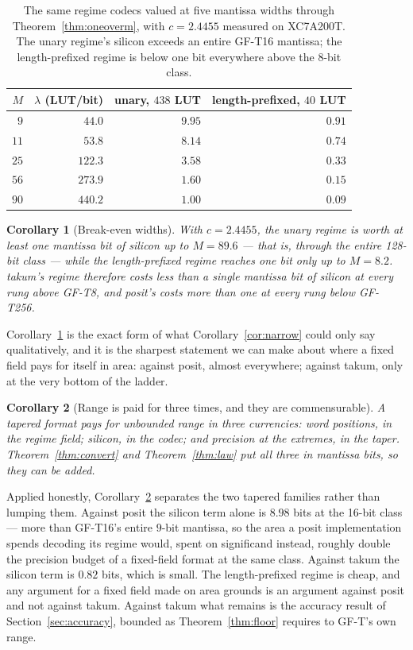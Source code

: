 \documentclass[11pt]{article}
\newtheorem{corollary}{Corollary}
\theoremstyle{definition}
\begin{document}
\begin{table}[t]\centering
\caption{The same regime codecs valued at five mantissa widths through
Theorem~\ref{thm:oneoverm}, with $c = 2.4455$ measured on XC7A200T. The unary
regime's silicon exceeds an entire GF-T16 mantissa; the length-prefixed regime is
below one bit everywhere above the 8-bit class.}
\label{tab:oneoverm}
\begin{tabular}{rrrr}
\toprule
$M$ & $\lambda$ (LUT/bit) & unary, $438$ LUT & length-prefixed, $40$ LUT \\
\midrule
$9$  & $44.0$  & $\mathbf{9.95}$ & $0.91$ \\
$11$ & $53.8$  & $8.14$ & $0.74$ \\
$25$ & $122.3$ & $3.58$ & $0.33$ \\
$56$ & $273.9$ & $1.60$ & $0.15$ \\
$90$ & $440.2$ & $1.00$ & $0.09$ \\
\bottomrule
\end{tabular}
\end{table}

\begin{corollary}[Break-even widths]
\label{cor:breakeven}
With $c = 2.4455$, the unary regime is worth at least one mantissa bit of silicon
up to $M = 89.6$ --- that is, through the entire 128-bit class --- while the
length-prefixed regime reaches one bit only up to $M = 8.2$. takum's regime
therefore costs less than a single mantissa bit of silicon at every rung above
GF-T8, and posit's costs more than one at every rung below GF-T256.
\end{corollary}

Corollary~\ref{cor:breakeven} is the exact form of what
Corollary~\ref{cor:narrow} could only say qualitatively, and it is the sharpest
statement we can make about where a fixed field pays for itself in area: against
posit, almost everywhere; against takum, only at the very bottom of the ladder.

\begin{corollary}[Range is paid for three times, and they are commensurable]
\label{cor:three}
A tapered format pays for unbounded range in three currencies: word positions,
in the regime field; silicon, in the codec; and precision at the extremes, in the
taper. Theorem~\ref{thm:convert} and Theorem~\ref{thm:law} put all three in
mantissa bits, so they can be added.
\end{corollary}

Applied honestly, Corollary~\ref{cor:three} separates the two tapered families
rather than lumping them. Against posit the silicon term alone is $8.98$ bits at
the 16-bit class --- more than GF-T16's entire $9$-bit mantissa, so the area a
posit implementation spends decoding its regime would, spent on significand
instead, roughly double the precision budget of a fixed-field format at the same
class. Against takum the silicon term is $0.82$ bits, which is small. The
length-prefixed regime is cheap, and any argument for a fixed field made on area
grounds is an argument against posit and not against takum. Against takum what
remains is the accuracy result of Section~\ref{sec:accuracy}, bounded as
Theorem~\ref{thm:floor} requires to GF-T's own range.
\end{document}
